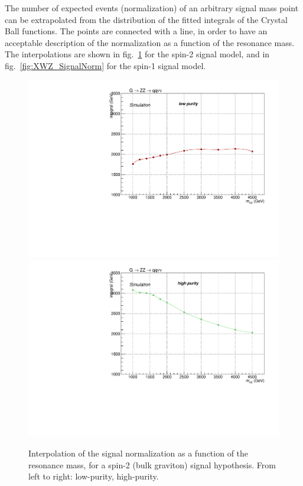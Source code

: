 \noindent The number of expected events (normalization) of an arbitrary signal mass point can be extrapolated from the distribution of the fitted integrals of the Crystal Ball functions. The points are connected with a line, in order to have an acceptable description of the normalization as a function of the resonance mass. The interpolations are shown in fig.~\ref{fig:XZZ_SignalNorm} for the spin-2 signal model, and in fig.~\ref{fig:XWZ_SignalNorm} for the spin-1 signal model.%

\begin{figure}[!htb]
  \centering
    \includegraphics[width=.495\textwidth]{plotsAlpha_tesi/XVZnnlp/XZZInv_SignalNorm.pdf}
    \includegraphics[width=.495\textwidth]{plotsAlpha_tesi/XVZnnhp/XZZInv_SignalNorm.pdf}
  \caption{Interpolation of the signal normalization as a function of the resonance mass, for a spin-2 (bulk graviton) signal hypothesis. From left to right: low-purity, high-purity.}
  \label{fig:XZZ_SignalNorm}
\end{figure}

